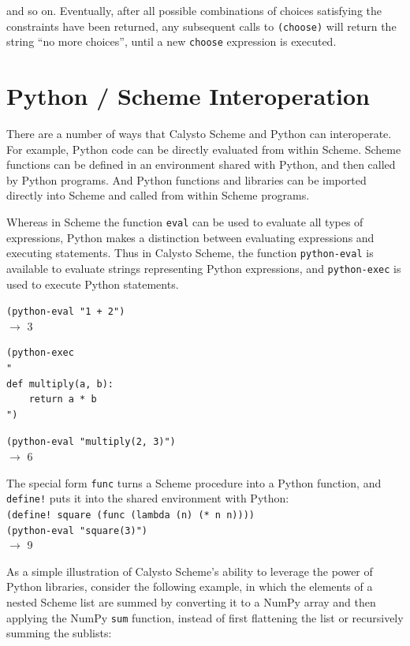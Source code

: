 \documentclass[acmsmall,screen,authorversion]{acmart}
\begin{document}
\noindent
and so on.  Eventually, after all possible combinations of choices satisfying
the constraints have been returned, any subsequent calls to \texttt{(choose)}
will return the string ``no more choices'', until a new \texttt{choose}
expression is executed.

\section{Python / Scheme Interoperation}

There are a number of ways that Calysto Scheme and Python can interoperate. For
example, Python code can be directly evaluated from within Scheme. Scheme
functions can be defined in an environment shared with Python, and then called
by Python programs. And Python functions and libraries can be imported directly
into Scheme and called from within Scheme programs.

Whereas in Scheme the function \texttt{eval} can be used to evaluate all types
of expressions, Python makes a distinction between evaluating expressions and
executing statements. Thus in Calysto Scheme, the function \texttt{python-eval} is
available to evaluate strings representing Python expressions, and
\texttt{python-exec} is used to execute Python statements.\\

{\small
\noindent
\texttt{(python-eval "1 + 2")}\\
$\rightarrow$ 3

\noindent
\begin{verbatim}
(python-exec
"
def multiply(a, b):
    return a * b
")
\end{verbatim}
\noindent\texttt{(python-eval "multiply(2, 3)")}\\
$\rightarrow$ 6\\
}

\noindent
The special form \texttt{func} turns a Scheme procedure into a Python function,
and \texttt{define!} puts it into the shared environment with Python:\\

{\small
\noindent
\texttt{(define! square (func (lambda (n) (* n n))))}\\
\texttt{(python-eval "square(3)")}\\
$\rightarrow$ 9\\
}

\noindent
As a simple illustration of Calysto Scheme's ability to leverage the power of
Python libraries, consider the following example, in which the elements of a
nested Scheme list are summed by converting it to a NumPy array and then
applying the NumPy \texttt{sum} function, instead of first flattening the list
or recursively summing the sublists:\\
\end{document}
